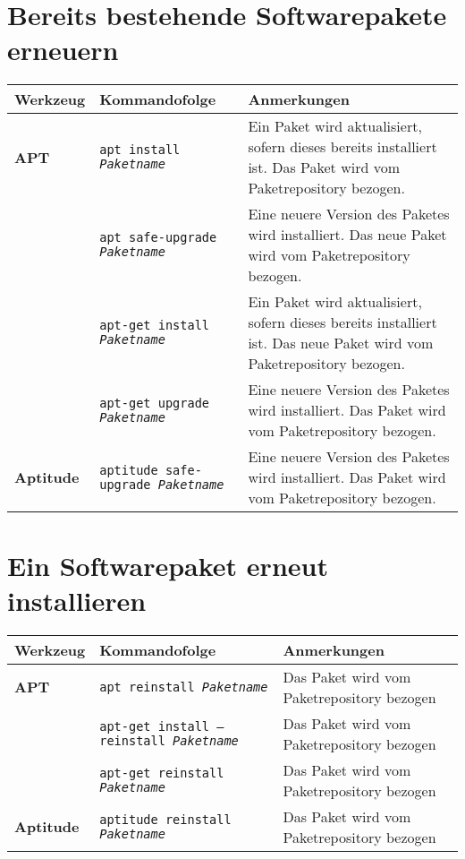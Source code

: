\documentclass[10pt]{article}
\begin{document}
\section{Bereits bestehende Softwarepakete erneuern}
\begin{tabular}{ p{3.5cm} p{9cm} p{11cm}}
  \hline
  \rowcolor{Gray}
  \textbf{Werkzeug} & \textbf{Kommandofolge} & \textbf{Anmerkungen} \\
  \hline 
  \textbf{APT} & \texttt{apt install \textit{Paketname}} & Ein Paket wird aktualisiert, sofern dieses bereits installiert ist. Das Paket wird vom Paketrepository bezogen. \\
  \rowcolor{Gray}
   & \texttt{apt safe-upgrade \textit{Paketname}} &  Eine neuere Version des Paketes wird installiert. Das neue Paket wird vom Paketrepository bezogen.\\
   & \texttt{apt-get install \textit{Paketname}} & Ein Paket wird aktualisiert, sofern dieses bereits installiert ist. Das neue Paket wird vom Paketrepository bezogen. \\
  \rowcolor{Gray}
   & \texttt{apt-get upgrade \textit{Paketname}} & Eine neuere Version des Paketes wird installiert. Das Paket wird vom Paketrepository bezogen.\\
  \textbf{Aptitude} & \texttt{aptitude safe-upgrade \textit{Paketname}} &  Eine neuere Version des Paketes wird installiert. Das Paket wird vom Paketrepository bezogen.\\
  \hline
\end{tabular}

\newpage

\cheatsheet

\section{Ein Softwarepaket erneut installieren}
\begin{tabular}{ p{3.5cm} p{9cm} p{11cm}}
  \hline
  \rowcolor{Gray}
  \textbf{Werkzeug} & \textbf{Kommandofolge} & \textbf{Anmerkungen} \\
  \hline 
  \textbf{APT} & \texttt{apt reinstall \textit{Paketname}} & Das Paket wird vom Paketrepository bezogen \\
  \rowcolor{Gray}
  & \texttt{apt-get install --reinstall \textit{Paketname}} & Das Paket wird vom Paketrepository bezogen \\
  & \texttt{apt-get reinstall \textit{Paketname}} & Das Paket wird vom Paketrepository bezogen \\
  \rowcolor{Gray}
  \textbf{Aptitude} & \texttt{aptitude reinstall \textit{Paketname}} & Das Paket wird vom Paketrepository bezogen \\
  \hline
\end{tabular}
\end{document}
